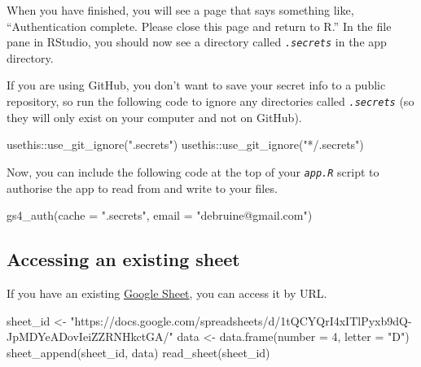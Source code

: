 \documentclass[
  oneside]{book}
\newenvironment{Shaded}{\begin{snugshade}}{\end{snugshade}}
\newcommand{\AttributeTok}[1]{\textcolor[rgb]{0.77,0.63,0.00}{#1}}
\newcommand{\DecValTok}[1]{\textcolor[rgb]{0.00,0.00,0.81}{#1}}
\newcommand{\FunctionTok}[1]{\textcolor[rgb]{0.00,0.00,0.00}{#1}}
\newcommand{\NormalTok}[1]{#1}
\newcommand{\OtherTok}[1]{\textcolor[rgb]{0.56,0.35,0.01}{#1}}
\newcommand{\SpecialCharTok}[1]{\textcolor[rgb]{0.00,0.00,0.00}{#1}}
\newcommand{\StringTok}[1]{\textcolor[rgb]{0.31,0.60,0.02}{#1}}
\begin{document}
When you have finished, you will see a page that says something like, ``Authentication complete. Please close this page and return to R.'' In the file pane in RStudio, you should now see a directory called \textit{\texttt{.secrets}} in the app directory.

If you are using GitHub, you don't want to save your secret info to a public repository, so run the following code to ignore any directories called \textit{\texttt{.secrets}} (so they will only exist on your computer and not on GitHub).

\begin{Shaded}
\begin{Highlighting}[]
\NormalTok{usethis}\SpecialCharTok{::}\FunctionTok{use\_git\_ignore}\NormalTok{(}\StringTok{".secrets"}\NormalTok{)}
\NormalTok{usethis}\SpecialCharTok{::}\FunctionTok{use\_git\_ignore}\NormalTok{(}\StringTok{"*/.secrets"}\NormalTok{)}
\end{Highlighting}
\end{Shaded}

Now, you can include the following code at the top of your \textit{\texttt{app.R}} script to authorise the app to read from and write to your files.

\begin{Shaded}
\begin{Highlighting}[]
\FunctionTok{gs4\_auth}\NormalTok{(}\AttributeTok{cache =} \StringTok{".secrets"}\NormalTok{, }\AttributeTok{email =} \StringTok{"debruine@gmail.com"}\NormalTok{)}
\end{Highlighting}
\end{Shaded}

\hypertarget{accessing-an-existing-sheet}{%
\subsection{Accessing an existing sheet}\label{accessing-an-existing-sheet}}

If you have an existing \href{https://docs.google.com/spreadsheets/u/0/}{Google Sheet}, you can access it by URL.

\begin{Shaded}
\begin{Highlighting}[]
\NormalTok{sheet\_id }\OtherTok{\textless{}{-}} \StringTok{"https://docs.google.com/spreadsheets/d/1tQCYQrI4xITlPyxb9dQ{-}JpMDYeADovIeiZZRNHkctGA/"}
\NormalTok{data }\OtherTok{\textless{}{-}} \FunctionTok{data.frame}\NormalTok{(}\AttributeTok{number =} \DecValTok{4}\NormalTok{, }\AttributeTok{letter =} \StringTok{"D"}\NormalTok{)}
\FunctionTok{sheet\_append}\NormalTok{(sheet\_id, data)}
\FunctionTok{read\_sheet}\NormalTok{(sheet\_id)}
\end{Highlighting}
\end{Shaded}
\end{document}
